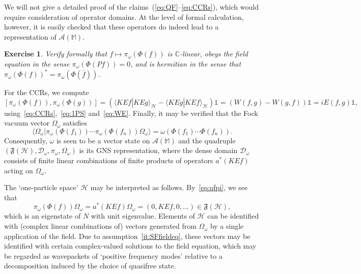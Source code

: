 \documentclass[12pt,a4paper]{article}
\newcommand{\1}{\mathds{1}}                         %
\newcommand{\CC}{\mathbb{C}}           %
\newcommand{\MM}{\mathbb{M}}
\newcommand{\FF}{{\mathfrak{F}}}
\newcommand{\HH}{{\mathcal{H}}}
\newcommand{\DD}{{\mathscr{D}}}
\newcommand{\II}{{\mathbb{1}}}
\newcommand{\Ac}{{\mathcal{A}}}
\newcommand{\ip}[2]{\langle #1|#2\rangle}
\newtheorem{exercise}[theorem]{Exercise}
\begin{document}
We will not give a detailed proof of the claims~(\ref{eq:QF}--\ref{eq:CCRs}), which would require consideration of operator domains.
At the level of formal calculation, however, it is easily checked that these operators do indeed lead to a representation of $\Ac(\MM)$.
\begin{exercise} Verify formally that $f\mapsto \pi_\omega(\Phi(f))$ is $\CC$-linear, obeys the field equation in the sense $\pi_\omega(\Phi(Pf))=0$, and is hermitian in the sense that $\pi_\omega(\Phi(f))^*=\pi_\omega(\Phi(\overline{f}))$.
\end{exercise}
For the CCRs, we compute
\[
[\pi_\omega(\Phi(f)),\pi_\omega(\Phi(g))] = \left(\ip{KEf}{KEg}_\HH - \ip{KEg}{KEf}_\HH\right)\II = 
\left(W(f,g)-W(g,f)\right)\II = iE(f,g)\II,
\]
using~\eqref{eq:CCRs},~\eqref{eq:1PS} and~\eqref{eq:WE}. Finally, 
it may be verified that the Fock vacuum vector $\Omega_\omega$ satisfies
\[
\ip{\Omega_\omega}{\pi_\omega(\Phi(f_1))\cdots \pi_\omega(\Phi(f_n))\Omega_\omega} = \omega(\Phi(f_1)\cdots \Phi(f_n)).
\]
Consequently, $\omega$ is seen to be a vector state on $\Ac(\MM)$ 
and the quadruple $(\FF(\HH), \DD_\omega,\pi_\omega,\Omega_\omega)$ is its GNS representation, where
the dense domain $\DD_\omega$ consists of finite linear combinations of finite products of operators $a^*(KEf)$ acting on $\Omega_\omega$.

The `one-particle space' $\HH$ may be interpreted as follows.  By~\eqref{eq:qfpi}, we see that
\[
\pi_\omega(\Phi(f))\Omega_\omega = a^*(KEf)\Omega_\omega = (0,KEf,0,\ldots)\in\FF(\HH) ,
\]
which is an eigenstate of $N$ with unit eigenvalue. Elements of $\HH$ can be identified with (complex linear combinations of) vectors generated from $\Omega_\omega$ by a single application of the field. Due to assumption~\ref{it:SFfieldeq}, these vectors may be identified with certain complex-valued solutions to the field equation, which may be regarded as wavepackets of `positive frequency modes' relative to a decomposition induced by the choice of quasifree state. 
\end{document}
